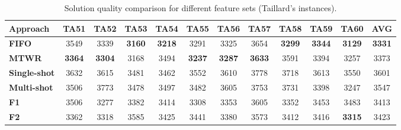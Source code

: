 \documentclass[runningheads]{llncs}
\begin{document}
\begin{table}[bt]
  \begin{center}
    \caption{Solution quality comparison for different feature sets (Taillard's instances).}
    \label{tab4}
    \addtolength{\tabcolsep}{0.9pt}
    \begin{tabular}{|l|c|c|c|c|c|c|c|c|c|c|c|} \hline
      \textbf{Approach}   & TA51                           & TA52                           & TA53                           & TA54 & TA55                           & TA56                           & TA57                           & TA58 & TA59                           & TA60 & AVG  \\ \hline\hline
      \textbf{FIFO}        & 3549                           & 3339                           & \textbf{3160}              & \textbf{3218} & 3291               & 3325                           & 3654                           & \textbf{3299} & \textbf{3344}                           & \textbf{3129} & \textbf{3331} \\
      \textbf{MTWR}        & \textbf{3364}           & \textbf{3304}              & 3168                           & 3494 & \textbf{3237}                           & \textbf{3287}               & \textbf{3633}              & 3591 & 3394                           & 3257 & 3373 \\
      \textbf{Single-shot} & 3632                           & 3615                           & 3481                           & 3462 & 3552                           & 3610                           & 3778                           & 3718 & 3613                           & 3550 & 3601 \\ %
      \textbf{Multi-shot}         & 3506                           & 3773                           & 3478                           & 3497 & 3482                           & 3605                           & 3753                           & 3731 & 3398                           & 3247 & 3547 \\ \hline
      \textbf{F1}          & 3506                           & 3277                           & 3382                           & 3414 & 3308                           & 3353                           & 3605                           & 3352 & 3453                           & 3483 & 3413 \\
      \textbf{F2}          & 3362                           & 3318                           & 3585                           & 3425 & 3441                           & 3380                           & 3573                           & 3412 & 3416                           & \textbf{3315} & 3423 \\

\end{tabular}
\end{center}
\end{table}
\end{document}
